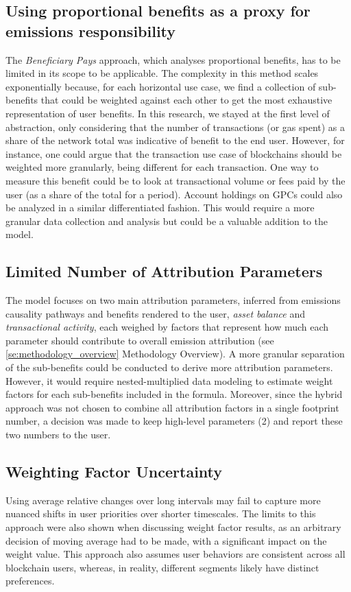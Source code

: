 \documentclass[11pt]{report}
\begin{document}
\subsection*{Using proportional benefits as a proxy for emissions responsibility}
The \textit{Beneficiary Pays} approach, which analyses proportional benefits, has to be limited in its scope to be applicable. The complexity in this method scales exponentially because, for each horizontal use case, we find a collection of sub-benefits that could be weighted against each other to get the most exhaustive representation of user benefits. In this research, we stayed at the first level of abstraction, only considering that the number of transactions (or gas spent) as a share of the network total was indicative of benefit to the end user. However, for instance, one could argue that the transaction use case of blockchains should be weighted more granularly, being different for each transaction. One way to measure this benefit could be to look at transactional volume or fees paid by the user (as a share of the total for a period). Account holdings on GPCs could also be analyzed in a similar differentiated fashion. This would require a more granular data collection and analysis but could be a valuable addition to the model.

\subsection*{Limited Number of Attribution Parameters}
The model focuses on two main attribution parameters, inferred from emissions causality pathways and benefits rendered to the user, \textit{asset balance} and \textit{transactional activity}, each weighed by factors that represent how much each parameter should contribute to overall emission attribution (see \ref{se:methodology_overview} Methodology Overview). A more granular separation of the sub-benefits could be conducted to derive more attribution parameters. However, it would require nested-multiplied data modeling to estimate weight factors for each sub-benefits included in the formula. Moreover, since the hybrid approach was not chosen to combine all attribution factors in a single footprint number, a decision was made to keep high-level parameters (2) and report these two numbers to the user.


\subsection*{Weighting Factor Uncertainty}
Using average relative changes over long intervals may fail to capture more nuanced shifts in user priorities over shorter timescales. The limits to this approach were also shown when discussing weight factor results, as an arbitrary decision of moving average had to be made, with a significant impact on the weight value. This approach also assumes user behaviors are consistent across all blockchain users, whereas, in reality, different segments likely have distinct preferences.
\end{document}
